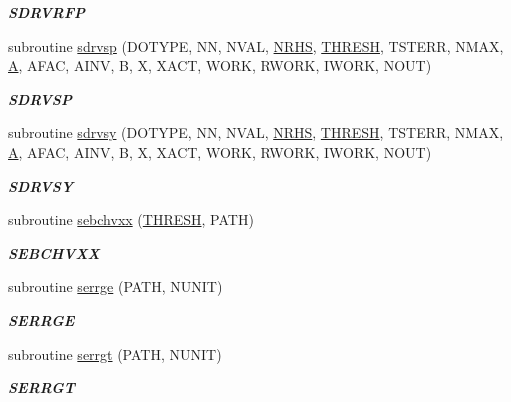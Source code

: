 \begin{DoxyCompactItemize}
\begin{DoxyCompactList}\small\item\em {\bfseries S\+D\+R\+V\+R\+F\+P} \end{DoxyCompactList}\item 
subroutine \hyperlink{group__single__lin_ga0ce43499b7d3dea5feb22f0a9ce90696}{sdrvsp} (D\+O\+T\+Y\+P\+E, N\+N, N\+V\+A\+L, \hyperlink{example__user_8c_aa0138da002ce2a90360df2f521eb3198}{N\+R\+H\+S}, \hyperlink{zlaqgs_8c_a0656018abfc9fa2821827415f5d5ea57}{T\+H\+R\+E\+S\+H}, T\+S\+T\+E\+R\+R, N\+M\+A\+X, \hyperlink{classA}{A}, A\+F\+A\+C, A\+I\+N\+V, B, X, X\+A\+C\+T, W\+O\+R\+K, R\+W\+O\+R\+K, I\+W\+O\+R\+K, N\+O\+U\+T)
\begin{DoxyCompactList}\small\item\em {\bfseries S\+D\+R\+V\+S\+P} \end{DoxyCompactList}\item 
subroutine \hyperlink{group__single__lin_ga72e0c0ee5697c52ea15adb94af9fcecb}{sdrvsy} (D\+O\+T\+Y\+P\+E, N\+N, N\+V\+A\+L, \hyperlink{example__user_8c_aa0138da002ce2a90360df2f521eb3198}{N\+R\+H\+S}, \hyperlink{zlaqgs_8c_a0656018abfc9fa2821827415f5d5ea57}{T\+H\+R\+E\+S\+H}, T\+S\+T\+E\+R\+R, N\+M\+A\+X, \hyperlink{classA}{A}, A\+F\+A\+C, A\+I\+N\+V, B, X, X\+A\+C\+T, W\+O\+R\+K, R\+W\+O\+R\+K, I\+W\+O\+R\+K, N\+O\+U\+T)
\begin{DoxyCompactList}\small\item\em {\bfseries S\+D\+R\+V\+S\+Y} \end{DoxyCompactList}\item 
subroutine \hyperlink{group__single__lin_ga8b9d52c28582eb5ba9ff59f530fb9714}{sebchvxx} (\hyperlink{zlaqgs_8c_a0656018abfc9fa2821827415f5d5ea57}{T\+H\+R\+E\+S\+H}, P\+A\+T\+H)
\begin{DoxyCompactList}\small\item\em {\bfseries S\+E\+B\+C\+H\+V\+X\+X} \end{DoxyCompactList}\item 
subroutine \hyperlink{group__single__lin_gaa4f9f4c7ea15673b0e62d7e8ab7218d7}{serrge} (P\+A\+T\+H, N\+U\+N\+I\+T)
\begin{DoxyCompactList}\small\item\em {\bfseries S\+E\+R\+R\+G\+E} \end{DoxyCompactList}\item 
subroutine \hyperlink{group__single__lin_ga1bee0f0bfee716bb62997d696cf56cc5}{serrgt} (P\+A\+T\+H, N\+U\+N\+I\+T)
\begin{DoxyCompactList}\small\item\em {\bfseries S\+E\+R\+R\+G\+T} \end{DoxyCompactList}\item 

\end{DoxyCompactItemize}
